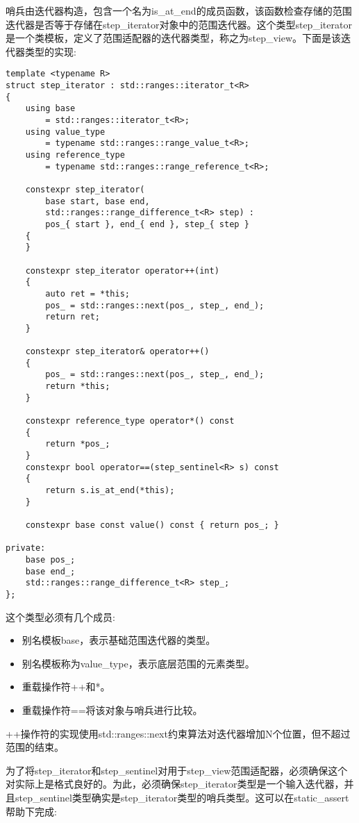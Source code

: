哨兵由迭代器构造，包含一个名为is\_at\_end的成员函数，该函数检查存储的范围迭代器是否等于存储在step\_iterator对象中的范围迭代器。这个类型step\_iterator是一个类模板，定义了范围适配器的迭代器类型，称之为step\_view。下面是该迭代器类型的实现:

\begin{lstlisting}[style=styleCXX]
template <typename R>
struct step_iterator : std::ranges::iterator_t<R>
{
	using base
		= std::ranges::iterator_t<R>;
	using value_type
		= typename std::ranges::range_value_t<R>;
	using reference_type
		= typename std::ranges::range_reference_t<R>;
		
	constexpr step_iterator(
		base start, base end,
		std::ranges::range_difference_t<R> step) :
		pos_{ start }, end_{ end }, step_{ step }
	{
	}

	constexpr step_iterator operator++(int)
	{
		auto ret = *this;
		pos_ = std::ranges::next(pos_, step_, end_);
		return ret;
	}

	constexpr step_iterator& operator++()
	{
		pos_ = std::ranges::next(pos_, step_, end_);
		return *this;
	}

	constexpr reference_type operator*() const
	{
		return *pos_;
	}
	constexpr bool operator==(step_sentinel<R> s) const
	{
		return s.is_at_end(*this);
	}

	constexpr base const value() const { return pos_; }
	
private:
	base pos_;
	base end_;
	std::ranges::range_difference_t<R> step_;
};
\end{lstlisting}

这个类型必须有几个成员:

\begin{itemize}
\item
别名模板base，表示基础范围迭代器的类型。

\item
别名模板称为value\_type，表示底层范围的元素类型。

\item
重载操作符++和*。

\item
重载操作符==将该对象与哨兵进行比较。
\end{itemize}

++操作符的实现使用std::ranges::next约束算法对迭代器增加N个位置，但不超过范围的结束。

为了将step\_iterator和step\_sentinel对用于step\_view范围适配器，必须确保这个对实际上是格式良好的。为此，必须确保step\_iterator类型是一个输入迭代器，并且step\_sentinel类型确实是step\_iterator类型的哨兵类型。这可以在static\_assert帮助下完成:

